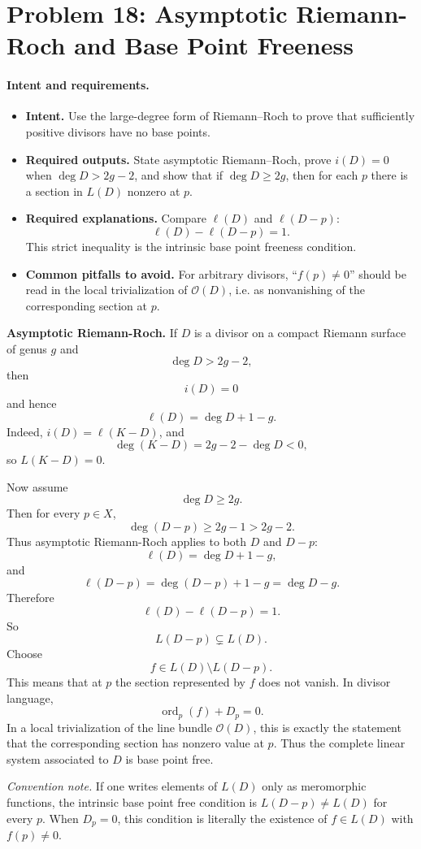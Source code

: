 \documentclass[11pt]{article}
\newcommand{\ord}{\operatorname{ord}}
\newenvironment{intentrequirements}{%
\paragraph{Intent and requirements.}
\begin{itemize}[leftmargin=*, itemsep=0.25em]
}{%
\end{itemize}
}
\begin{document}
\section*{Problem 18: Asymptotic Riemann-Roch and Base Point Freeness}

\begin{intentrequirements}
\item \textbf{Intent.} Use the large-degree form of Riemann--Roch to prove that sufficiently positive divisors have no base points.
\item \textbf{Required outputs.} State asymptotic Riemann--Roch, prove $i(D)=0$ when $\deg D>2g-2$, and show that if $\deg D\geq2g$, then for each $p$ there is a section in $L(D)$ nonzero at $p$.
\item \textbf{Required explanations.} Compare $\ell(D)$ and $\ell(D-p)$:
\[
 \ell(D)-\ell(D-p)=1.
\]
This strict inequality is the intrinsic base point freeness condition.
\item \textbf{Common pitfalls to avoid.} For arbitrary divisors, ``$f(p)\neq0$'' should be read in the local trivialization of $\mathcal O(D)$, i.e. as nonvanishing of the corresponding section at $p$.
\end{intentrequirements}

\textbf{Asymptotic Riemann-Roch.}
If $D$ is a divisor on a compact Riemann surface of genus $g$ and
\[
 \deg D>2g-2,
\]
then
\[
 i(D)=0
\]
and hence
\[
 \ell(D)=\deg D+1-g.
\]
Indeed, $i(D)=\ell(K-D)$, and
\[
 \deg(K-D)=2g-2-\deg D<0,
\]
so $L(K-D)=0$.

Now assume
\[
 \deg D\geq 2g.
\]
Then for every $p\in X$,
\[
 \deg(D-p)\geq2g-1>2g-2.
\]
Thus asymptotic Riemann-Roch applies to both $D$ and $D-p$:
\[
 \ell(D)=\deg D+1-g,
\]
and
\[
 \ell(D-p)=\deg(D-p)+1-g=\deg D-g.
\]
Therefore
\[
 \ell(D)-\ell(D-p)=1.
\]
So
\[
 L(D-p)\subsetneq L(D).
\]
Choose
\[
 f\in L(D)\setminus L(D-p).
\]
This means that at $p$ the section represented by $f$ does not vanish. In divisor language,
\[
 \ord_p(f)+D_p=0.
\]
In a local trivialization of the line bundle $\mathcal O(D)$, this is exactly the statement that the corresponding section has nonzero value at $p$.
Thus the complete linear system associated to $D$ is base point free.

\emph{Convention note.} If one writes elements of $L(D)$ only as meromorphic functions, the intrinsic base point free condition is $L(D-p)\neq L(D)$ for every $p$. When $D_p=0$, this condition is literally the existence of $f\in L(D)$ with $f(p)\neq0$.
\end{document}

